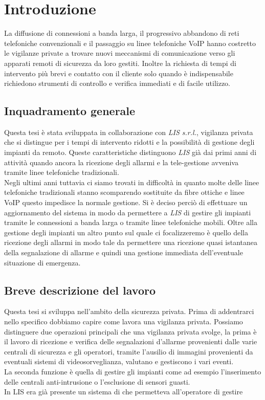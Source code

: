 \chapter{Introduzione}
\label{Introduzione}
\thispagestyle{empty}


\noindent La diffusione di connessioni a banda larga, il progressivo abbandono di reti telefoniche convenzionali e il passaggio su linee telefoniche VoIP hanno costretto le vigilanze private a trovare nuovi meccanismi di comunicazione verso gli apparati remoti di sicurezza da loro gestiti. Inoltre la richiesta di tempi di intervento più brevi e contatto con il cliente solo quando è indispensabile richiedono strumenti di controllo e verifica immediati e di facile utilizzo.

\section{Inquadramento generale}
Questa tesi è stata sviluppata in collaborazione con \emph{LIS s.r.l.}, vigilanza privata che si distingue per i tempi di intervento ridotti e la possibilità di gestione degli impianti da remoto. Queste caratteristiche distinguono \emph{LIS} già dai primi anni di attività quando ancora la ricezione degli allarmi e la tele-gestione avveniva tramite linee telefoniche tradizionali.\\
Negli ultimi anni tuttavia ci siamo trovati in difficoltà in quanto molte delle linee telefoniche tradizionali stanno scomparendo sostituite da fibre ottiche e linee VoIP questo impedisce la normale gestione. Si è deciso perciò di effettuare un aggiornamento del sistema in modo da permettere a \emph{LIS} di gestire gli impianti tramite le connessioni a banda larga o tramite linee telefoniche mobili. Oltre alla gestione degli impianti un altro punto sul quale ci focalizzeremo è quello della ricezione degli allarmi in modo tale da permettere una ricezione quasi istantanea della segnalazione di allarme e quindi una gestione immediata dell'eventuale situazione di emergenza.\\

\section{Breve descrizione del lavoro}
Questa tesi si sviluppa nell'ambito della sicurezza privata. Prima di addentrarci nello specifico dobbiamo capire come lavora una vigilanza privata. Possiamo distinguere due operazioni principali che una vigilanza privata svolge, la prima è il lavoro di ricezione e verifica delle segnalazioni d'allarme provenienti dalle varie centrali di sicurezza e gli operatori, tramite l'ausilio di immagini provenienti da eventuali sistemi di videosorveglianza, valutano e gestiscono i vari eventi.\\
La seconda funzione è quella di gestire gli impianti come ad esempio l'inserimento delle centrali anti-intrusione o l'esclusione di sensori guasti.\\
In LIS era già presente un sistema di che permetteva all'operatore di gestire 

